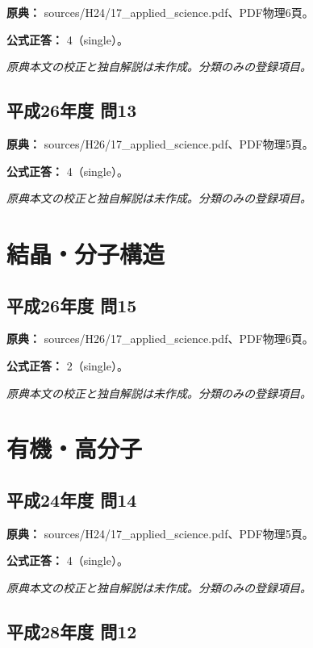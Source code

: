 \noindent\textbf{原典：} sources/H24/17\_applied\_science.pdf、PDF物理6頁。

\textbf{公式正答：} 4（single）。

\par\textit{原典本文の校正と独自解説は未作成。分類のみの登録項目。}

\subsection{平成26年度 問13}
\label{q:h26-reg-applied-13}

\noindent\textbf{原典：} sources/H26/17\_applied\_science.pdf、PDF物理5頁。

\textbf{公式正答：} 4（single）。

\par\textit{原典本文の校正と独自解説は未作成。分類のみの登録項目。}

\section{結晶・分子構造}

\subsection{平成26年度 問15}
\label{q:h26-reg-applied-15}

\noindent\textbf{原典：} sources/H26/17\_applied\_science.pdf、PDF物理6頁。

\textbf{公式正答：} 2（single）。

\par\textit{原典本文の校正と独自解説は未作成。分類のみの登録項目。}

\section{有機・高分子}

\subsection{平成24年度 問14}
\label{q:h24-reg-applied-14}

\noindent\textbf{原典：} sources/H24/17\_applied\_science.pdf、PDF物理5頁。

\textbf{公式正答：} 4（single）。

\par\textit{原典本文の校正と独自解説は未作成。分類のみの登録項目。}

\subsection{平成28年度 問12}
\label{q:h28-reg-applied-12}

